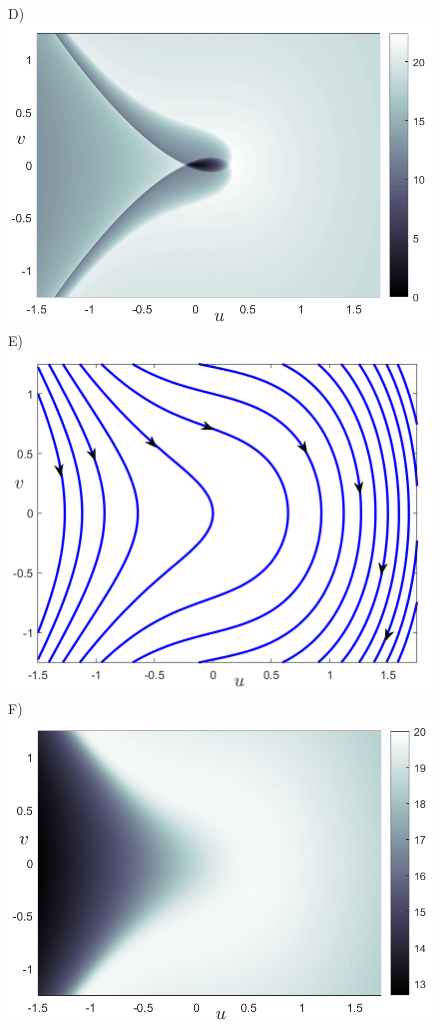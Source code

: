 \documentclass[8pt]{article}
\begin{document}
\begin{figure}[htbp]
\begin{center}
		D)\includegraphics[scale=0.3]{fig2d.png}
		E)\includegraphics[scale=0.26]{fig2e.png}
		F)\includegraphics[scale=0.3]{fig2f.png}

\end{center}
\end{figure}
\end{document}
